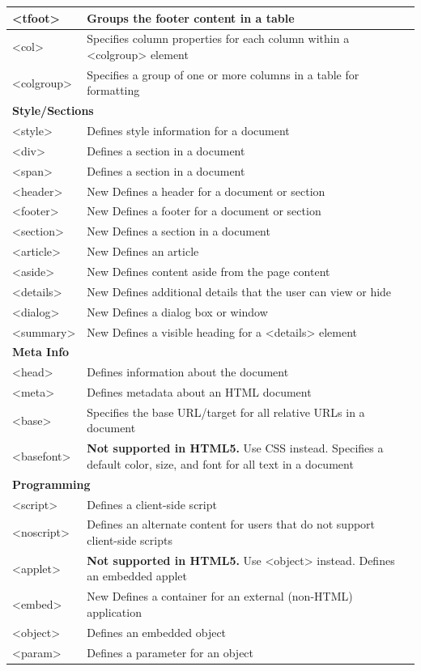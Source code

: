\documentclass[a4paper,oneside]{book}
\begin{document}
\begin{longtable}[H]{| p{5cm} | p{10cm} |}
<tfoot>	 & Groups the footer content in a table \\ \hline 
<col>	 & Specifies column properties for each column within a <colgroup> element \\ \hline 
<colgroup> & 	Specifies a group of one or more columns in a table for formatting \\ \hline 
\multicolumn{2}{|l|}{\textbf{Style/Sections}}  \\ \hline 
<style>	 & Defines style information for a document \\ \hline 
<div> & 	Defines a section in a document \\ \hline 
<span>	 & Defines a section in a document \\ \hline 
<header> & New	Defines a header for a document or section \\ \hline 
<footer> & New	Defines a footer for a document or section \\ \hline 
<section> & New	Defines a section in a document \\ \hline 
<article> & New	Defines an article \\ \hline 
<aside> & New	Defines content aside from the page content \\ \hline 
<details> & New	Defines additional details that the user can view or hide \\ \hline 
<dialog> & New	Defines a dialog box or window \\ \hline 
<summary> & New	Defines a visible heading for a <details> element \\ \hline 
\multicolumn{2}{|l|}{\textbf{Meta Info}}	  \\ \hline 
<head>	 & Defines information about the document \\ \hline 
<meta>	 & Defines metadata about an HTML document \\ \hline 
<base>	 & Specifies the base URL/target for all relative URLs in a document \\ \hline 
<basefont> & \textbf{	Not supported in HTML5.} Use CSS instead.
Specifies a default color, size, and font for all text in a document \\ \hline 
\multicolumn{2}{|l|}{\textbf{Programming}}	 \\ \hline 
<script>	 & Defines a client-side script \\ \hline 
<noscript>	 & Defines an alternate content for users that do not support client-side scripts \\ \hline 
<applet>	 & \textbf{Not supported in HTML5.} Use <object> instead. 
Defines an embedded applet \\ \hline 
<embed> & New	Defines a container for an external (non-HTML) application \\ \hline 
<object> & 	Defines an embedded object \\ \hline 
<param>	 & Defines a parameter for an object \\ \hline 
\end{longtable}
\end{document}
